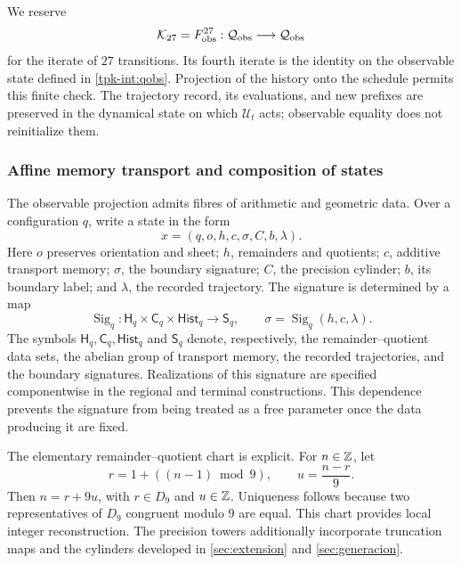 We reserve
\[
 \mathcal K_{27}=F_{\rm obs}^{27}:
 \mathcal Q_{\rm obs}\longrightarrow\mathcal Q_{\rm obs}
\]
for the iterate of \(27\) transitions. Its fourth iterate is the
identity on the observable state defined in \eqref{tpk-int:qobs}.
Projection of the history onto the schedule permits this finite
check. The trajectory record, its evaluations, and
new prefixes are preserved in the dynamical state on which
\(\mathcal U_t\) acts; observable equality does not reinitialize them.

\subsubsection{Affine memory transport and composition of states}
\label{tpk-int:memoria}

The observable projection admits fibres of arithmetic and geometric data.
Over a configuration \(q\), write a state in the form
\[
 x=(q,o,h,c,\sigma,C,b,\lambda).
\]
Here \(o\) preserves orientation and sheet; \(h\), remainders
and quotients; \(c\), additive transport memory; \(\sigma\),
the boundary signature; \(C\), the precision cylinder; \(b\), its
boundary label; and \(\lambda\), the recorded trajectory. The
signature is determined by a map
\[
 \operatorname{Sig}_q:
 \mathsf H_q\times\mathsf C_q\times\mathsf{Hist}_q
 \longrightarrow\mathsf S_q,
 \qquad \sigma=\operatorname{Sig}_q(h,c,\lambda).
\]
The symbols \(\mathsf H_q,\mathsf C_q,\mathsf{Hist}_q\) and
\(\mathsf S_q\) denote, respectively, the remainder--quotient data sets,
the abelian group of transport memory, the
recorded trajectories, and the boundary signatures.
Realizations of this signature are specified componentwise in
the regional and terminal constructions. This dependence prevents
the signature from being treated as a free parameter once the data producing it are fixed.

The elementary remainder--quotient chart is explicit. For
\(n\in\mathbb Z\), let
\[
 r=1+((n-1)\bmod9),\qquad u=\frac{n-r}{9}.
\]
Then \(n=r+9u\), with \(r\in D_9\) and \(u\in\mathbb Z\).
Uniqueness follows because two representatives of \(D_9\) congruent
modulo \(9\) are equal. This chart provides local integer
reconstruction. The precision towers additionally incorporate truncation
maps and the cylinders developed in
\ref{sec:extension} and \ref{sec:generacion}.

